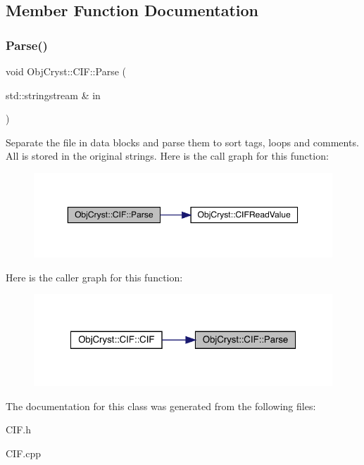 \subsection{Member Function Documentation}
\mbox{\label{class_obj_cryst_1_1_c_i_f_ad3d151ac993f8afcf4e5f22773df2e0c}} 
\subsubsection{\texorpdfstring{Parse()}{Parse()}}
{\footnotesize\ttfamily void Obj\+Cryst\+::\+C\+I\+F\+::\+Parse (\begin{DoxyParamCaption}\item[{std\+::stringstream \&}]{in }\end{DoxyParamCaption})}

Separate the file in data blocks and parse them to sort tags, loops and comments. All is stored in the original strings. Here is the call graph for this function\+:
\nopagebreak
\begin{figure}[H]
\begin{center}
\leavevmode
\includegraphics[width=350pt]{class_obj_cryst_1_1_c_i_f_ad3d151ac993f8afcf4e5f22773df2e0c_cgraph}
\end{center}
\end{figure}
Here is the caller graph for this function\+:
\nopagebreak
\begin{figure}[H]
\begin{center}
\leavevmode
\includegraphics[width=322pt]{class_obj_cryst_1_1_c_i_f_ad3d151ac993f8afcf4e5f22773df2e0c_icgraph}
\end{center}
\end{figure}


The documentation for this class was generated from the following files\+:\begin{DoxyCompactItemize}
\item 
C\+I\+F.\+h\item 
C\+I\+F.\+cpp\end{DoxyCompactItemize}
